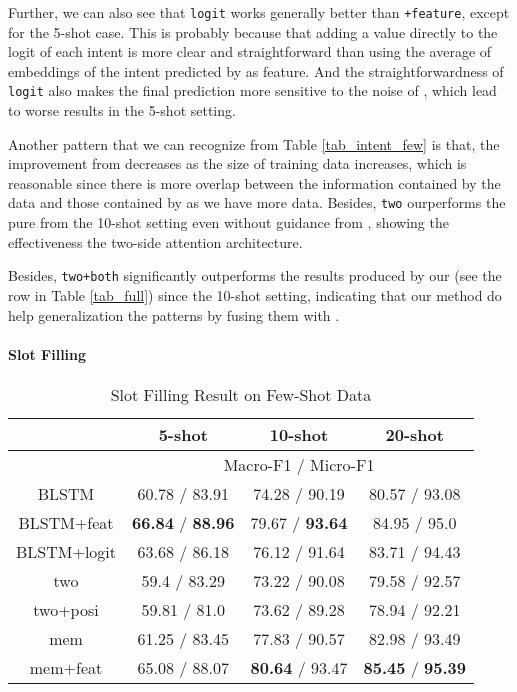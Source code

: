 Further, we can also see that \texttt{logit} works generally better than \texttt{+feature}, except for the 5-shot case. This is probably because that adding a value directly to the logit of each intent is more clear and straightforward than using the average of embeddings of the intent predicted by \RE as feature. And the straightforwardness of \texttt{logit} also makes the final prediction more sensitive to the noise of \RE, which lead to worse results in the 5-shot setting.

Another pattern that we can recognize from Table \ref{tab_intent_few} is that, the improvement from \RE decreases as the size of training data increases, which is reasonable since there is more overlap between the information contained by the data and those contained by \RE as we have more data. Besides, \texttt{two} ourperforms the pure \BLSTM from the 10-shot setting even without guidance from \RE, showing the effectiveness the two-side attention architecture.

Besides, \texttt{two+both} significantly outperforms the results produced by our \RE (see the \RE row in Table \ref{tab_full}) since the 10-shot setting, indicating that our method do help generalization the \RE patterns by fusing them with \NN. 


\paragraph{Slot Filling}

\begin{table}
\setlength{\tabcolsep}{0.23em}
\centering
\small{
\begin{tabular}{|c|c|c|c|}

\hline
  & \multicolumn{1}{|c|}{5-shot} & \multicolumn{1}{|c|}{10-shot} & \multicolumn{1}{|c|}{20-shot}  \\
 \hline
  &  \multicolumn{3}{|c|}{Macro-F1 / Micro-F1}   \\
\hline
BLSTM & 60.78 / 83.91 & 74.28  / 90.19 & 80.57 / 93.08 \\
\hline
BLSTM+feat & \textbf{66.84} / \textbf{88.96} & 79.67 / \textbf{93.64} & 84.95 / 95.0 \\
\hline
BLSTM+logit & 63.68 / 86.18 & 76.12 / 91.64  & 83.71 / 94.43 \\
\hline
two & 59.4 / 83.29 & 73.22 / 90.08 & 79.58 / 92.57 \\
\hline
two+posi & 59.81 / 81.0 & 73.62 / 89.28 & 78.94 / 92.21 \\
\hline
mem & 61.25 / 83.45 & 77.83 / 90.57 & 82.98 / 93.49 \\
\hline
mem+feat & 65.08 / 88.07 & \textbf{80.64} / 93.47 & \textbf{85.45} / \textbf{95.39} \\
\hline
\end{tabular}
}
\caption{Slot Filling Result on Few-Shot Data}
\label{tab_slot_few}
\end{table}


